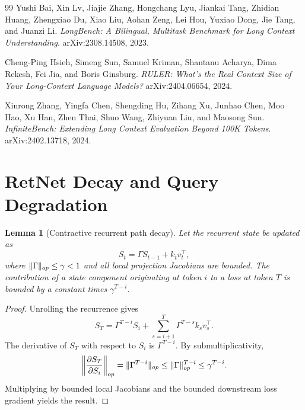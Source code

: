 \documentclass[11pt]{article}
\newtheorem{lemma}[theorem]{Lemma}
\DeclarePairedDelimiter{\norm}{\lVert}{\rVert}
\begin{document}
\begin{thebibliography}{99}
Yushi Bai, Xin Lv, Jiajie Zhang, Hongchang Lyu, Jiankai Tang, Zhidian Huang, Zhengxiao Du, Xiao Liu, Aohan Zeng, Lei Hou, Yuxiao Dong, Jie Tang, and Juanzi Li.
\textit{LongBench: A Bilingual, Multitask Benchmark for Long Context Understanding}.
arXiv:2308.14508, 2023.

Cheng-Ping Hsieh, Simeng Sun, Samuel Kriman, Shantanu Acharya, Dima Rekesh, Fei Jia, and Boris Ginsburg.
\textit{RULER: What's the Real Context Size of Your Long-Context Language Models?}
arXiv:2404.06654, 2024.

Xinrong Zhang, Yingfa Chen, Shengding Hu, Zihang Xu, Junhao Chen, Moo Hao, Xu Han, Zhen Thai, Shuo Wang, Zhiyuan Liu, and Maosong Sun.
\textit{InfiniteBench: Extending Long Context Evaluation Beyond 100K Tokens}.
arXiv:2402.13718, 2024.

\end{thebibliography}

\newpage
\appendix

\section{RetNet Decay and Query Degradation}
\label{app:retnet}

\begin{lemma}[Contractive recurrent path decay]
Let the recurrent state be updated as
\begin{equation}
S_t = \Gamma S_{t-1} + k_t v_t^\top,
\end{equation}
where $\norm{\Gamma}_{op}\leq \gamma<1$ and all local projection Jacobians are bounded. The contribution of a state component originating at token $i$ to a loss at token $T$ is bounded by a constant times $\gamma^{T-i}$.
\end{lemma}

\begin{proof}
Unrolling the recurrence gives
\begin{equation}
S_T=\Gamma^{T-i}S_i + \sum_{s=i+1}^{T}\Gamma^{T-s}k_s v_s^\top.
\end{equation}
The derivative of $S_T$ with respect to $S_i$ is $\Gamma^{T-i}$. By submultiplicativity,
\begin{equation}
\norm*{\frac{\partial S_T}{\partial S_i}}_{op}
=\norm{\Gamma^{T-i}}_{op}
\leq \norm{\Gamma}_{op}^{T-i}
\leq \gamma^{T-i}.
\end{equation}
Multiplying by bounded local Jacobians and the bounded downstream loss gradient yields the result.
\end{proof}
\end{document}
